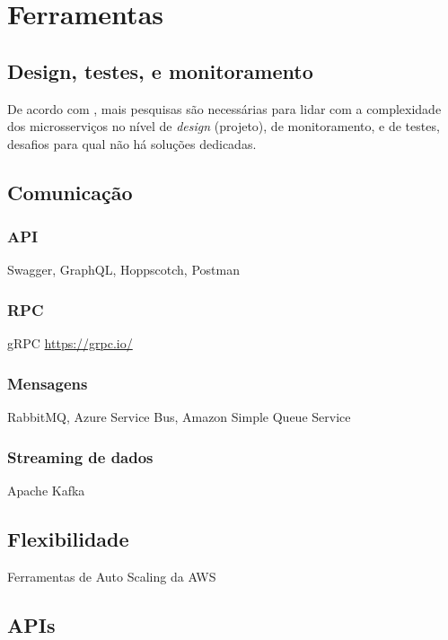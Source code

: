\chapter{Ferramentas}\label{chapter-ferramentas}


\section{Design, testes, e monitoramento}

De acordo com , mais pesquisas são necessárias para lidar com a complexidade dos microsserviços no nível de \emph{design} (projeto), de monitoramento, e de testes, desafios para qual não há soluções dedicadas.

\section{Comunicação}

\subsection*{API}
Swagger, GraphQL, Hoppscotch, Postman

\subsection*{RPC}
gRPC \url{https://grpc.io/}

\subsection*{Mensagens}
RabbitMQ, Azure Service Bus, Amazon Simple Queue Service

\subsection*{Streaming de dados}
Apache Kafka

\section{Flexibilidade}
Ferramentas de Auto Scaling da AWS

\section{APIs}

